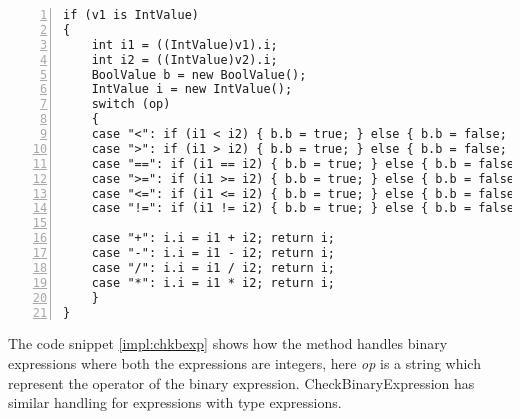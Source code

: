 		\begin{lstlisting}[basicstyle=\small\sffamily,
			keywords={break,case,const,continue,default,else,enum,
			for,if,return,switch,while,do,long,void,int,float,double,
			char,struct,typedef,include,size\_t},
			keywordstyle={\color{blue}},
			comment={[l]{//}}, morecomment={[s]{/*}{*/}}, commentstyle=\itshape,
			columns={[l]flexible}, numbers=left, numberstyle=\tiny,
			frameround=fftt, frame=shadowbox, captionpos=b,
			caption={Code snippet from CheckBinaryExpression},
			label=impl:chkbexp]
if (v1 is IntValue)
{
	int i1 = ((IntValue)v1).i;
	int i2 = ((IntValue)v2).i;
	BoolValue b = new BoolValue();
	IntValue i = new IntValue();
	switch (op)
	{
	case "<": if (i1 < i2) { b.b = true; } else { b.b = false; } return b;
	case ">": if (i1 > i2) { b.b = true; } else { b.b = false; } return b;
	case "==": if (i1 == i2) { b.b = true; } else { b.b = false; } return b;
	case ">=": if (i1 >= i2) { b.b = true; } else { b.b = false; } return b;
	case "<=": if (i1 <= i2) { b.b = true; } else { b.b = false; } return b;
	case "!=": if (i1 != i2) { b.b = true; } else { b.b = false; } return b;

	case "+": i.i = i1 + i2; return i;
	case "-": i.i = i1 - i2; return i;
	case "/": i.i = i1 / i2; return i;
	case "*": i.i = i1 * i2; return i;
	}
}
		\end{lstlisting}
		The code snippet \ref{impl:chkbexp} shows how the method handles binary expressions 
		where both the expressions are integers, here {\it op} is a string which represent the operator of the binary expression. 
		CheckBinaryExpression has similar handling for expressions with type expressions.
		
